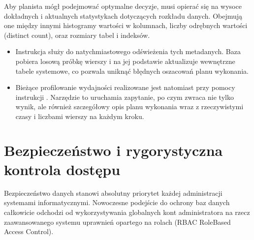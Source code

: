 \documentclass[letterpaper,10pt,english]{sphinxmanual}
\begin{document}
\sphinxAtStartPar
Aby planista mógł podejmować optymalne decyzje, musi opierać się na wysoce dokładnych i aktualnych statystykach dotyczących rozkładu danych. Obejmują one między innymi histogramy wartości w kolumnach, liczby odrębnych wartości (distinct count), oraz rozmiary tabel i indeksów.
\begin{itemize}
\item {} 
\sphinxAtStartPar
Instrukcja  służy do natychmiastowego odświeżenia tych metadanych. Baza pobiera losową próbkę wierszy i na jej podstawie aktualizuje wewnętrzne tabele systemowe, co pozwala uniknąć błędnych oszacowań planu wykonania.

\item {} 
\sphinxAtStartPar
Bieżące profilowanie wydajności realizowane jest natomiast przy pomocy instrukcji . Narzędzie to uruchamia zapytanie, po czym zwraca nie tylko wynik, ale również szczegółowy opis planu wykonania wraz z rzeczywistymi czasy i liczbami wierszy na każdym kroku.

\end{itemize}

\begin{sphinxVerbatim}[commandchars=\\\{\}]
\end{sphinxVerbatim}


\section{Bezpieczeństwo i rygorystyczna kontrola dostępu}
\label{\detokenize{rozdzial_1/index:bezpieczenstwo-i-rygorystyczna-kontrola-dostepu}}
\sphinxAtStartPar
Bezpieczeństwo danych stanowi absolutny priorytet każdej administracji systemami informatycznymi. Nowoczesne podejście do ochrony baz danych całkowicie odchodzi od wykorzystywania globalnych kont administratora na rzecz zaawansowanego systemu uprawnień opartego na rolach (RBAC \textendash{} Role\sphinxhyphen{}Based Access Control).
\end{document}
